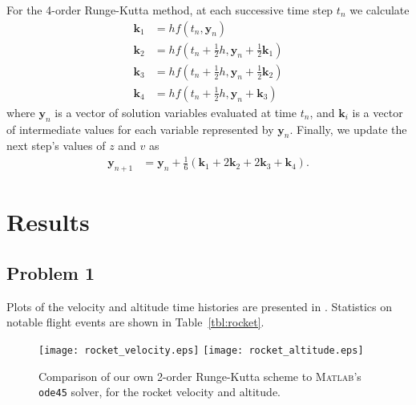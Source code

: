 \documentclass[12pt]{article}
\begin{document}
For the 4\th-order Runge-Kutta method, at each successive time step $t_n$ we calculate
\begin{equation}
\begin{aligned}
\mathbf{k}_1 &= h f(t_n, \mathbf{y}_n)
\\
\mathbf{k}_2 &= h f(t_n + \tfrac{1}{2} h, \mathbf{y}_n + \tfrac{1}{2} \mathbf{k}_1)
\\
\mathbf{k}_3 &= h f(t_n + \tfrac{1}{2} h, \mathbf{y}_n + \tfrac{1}{2} \mathbf{k}_2)
\\
\mathbf{k}_4 &= h f(t_n + \tfrac{1}{2} h, \mathbf{y}_n + \mathbf{k}_3)
\end{aligned}
\end{equation}
where $\mathbf{y}_n$ is a vector of solution variables evaluated at time $t_n$, and $\mathbf{k}_i$ is a vector of intermediate values for each variable represented by $\mathbf{y}_n$. Finally, we update the next step's values of $z$ and $v$ as
\begin{equation}
\begin{aligned}
\mathbf{y}_{n+1} &= \mathbf{y}_n + \tfrac{1}{6} \left( \mathbf{k}_1 + 2 \mathbf{k}_2 + 2 \mathbf{k}_3 + \mathbf{k}_4 \right)
.
\end{aligned}
\end{equation}

\section{Results} %

\subsection{Problem 1}

Plots of the velocity and altitude time histories are presented in . Statistics on notable flight events are shown in Table~\ref{tbl:rocket}.

\begin{figure}[h!]
\begin{center}
\texttt{[image: rocket\_velocity.eps]}
\texttt{[image: rocket\_altitude.eps]}
\\[6pt]
\caption{Comparison of our own 2\nd-order Runge-Kutta scheme to \textsc{Matlab}'s \lstinline|ode45| solver, for the rocket velocity and altitude.}
\label{fig:rocket_plots}
\end{center}
\end{figure}
\end{document}
